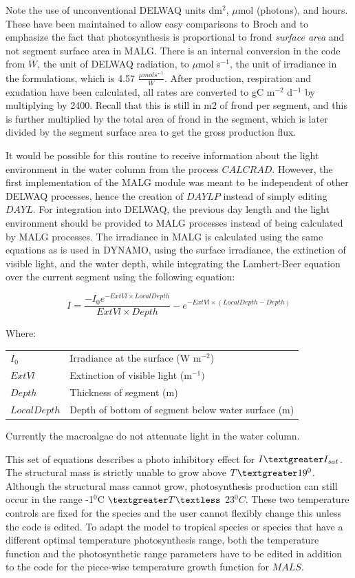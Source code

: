 \documentclass{deltares_manual}
\begin{document}
Note the use of unconventional DELWAQ units dm$^{2}$, $\mu$mol (photons), and hours. These have been maintained to allow easy comparisons to Broch and to emphasize the fact that photosynthesis is proportional to frond \textit{surface area} and not segment surface area in MALG. There is an internal conversion in the code from $W$, the unit of DELWAQ radiation, to $\mu$mol s$^{-1}$, the unit of irradiance in the formulations, which is 4.57 $\frac{\mu mol s^{-1}}{W}$. After production, respiration and exudation have been calculated, all rates are converted to gC m$^{-2}$ d$^{-1}$ by multiplying by 2400. Recall that this is still in m2 of frond per segment, and this is further multiplied by the total area of frond in the segment, which is later divided by the segment surface area to get the gross production flux.

It would be possible for this routine to receive information about the light environment in the water column from the process $CALCRAD$. However, the first implementation of the MALG module was meant to be independent of other DELWAQ processes, hence the creation of $DAYLP$ instead of simply editing $DAYL$. For integration into DELWAQ, the previous day length and the light environment should be provided to MALG processes instead of being calculated by MALG processes. The irradiance in MALG is calculated using the same equations as is used in DYNAMO, using the surface irradiance, the extinction of visible light, and the water depth, while integrating the Lambert-Beer equation over the current segment using the following equation:

\begin{equation}
I = \frac{-I_{0}e^{-ExtVl \times LocalDepth}}{ExtVl \times Depth}  - e^{-ExtVl \times (LocalDepth - Depth)}
\end{equation}

Where:\\
\begin{tabular}{ll}
$I_{0}$ & Irradiance at the surface (W m$^{-2}$)\\
$ExtVl$ & Extinction of visible light (m$^{-1})$\\
$Depth$ & Thickness of segment (m)\\
$LocalDepth$ & Depth of bottom of segment below water surface (m)\\
\end{tabular}

Currently the macroalgae do not attenuate light in the water column.

This set of equations describes a photo inhibitory effect for $I\textgreater I_{sat}$. The structural mass is strictly unable to grow above $T \textgreater 19^{0}$. Although the structural mass cannot grow, photosynthesis production can still occur in the range -1$^{0}$C $\textgreater T \textless$ 23$^{0}C$. These two temperature controls are fixed for the species and the user cannot flexibly change this unless the code is edited. To adapt the model to tropical species or species that have a different optimal temperature photosynthesis range, both the temperature function and the photosynthetic range parameters have to be edited in addition to the code for the piece-wise temperature growth function for $MALS$.
\end{document}
